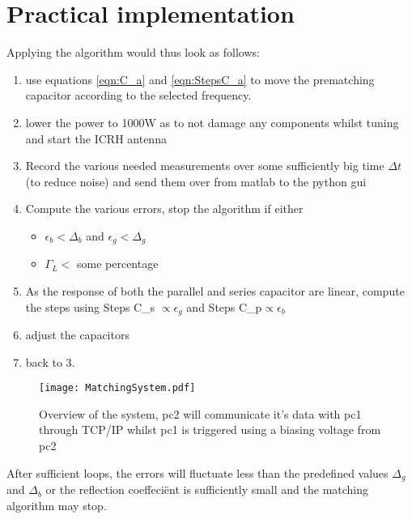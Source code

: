 \section{Practical implementation}
Applying the algorithm would thus look as follows:
\begin{enumerate}
	\item use equations \ref{eqn:C_a} and \ref{eqn:StepsC_a} to move the prematching capacitor according to the selected frequency.
	\item lower the power to 1000W as to not damage any components whilst tuning and start the ICRH antenna
	\item Record the various needed measurements over some sufficiently big time $\Delta t$ (to reduce noise) and send them over from matlab to the python gui 
	\item Compute the various errors, stop the algorithm if either 
		\begin{itemize}
			\item $\epsilon_b < \Delta_b$ and $\epsilon_g < \Delta_g$ 
			\item $\Gamma_L <$ some percentage
		\end{itemize}
	\item As the response of both the parallel and series capacitor are linear, compute the steps using Steps C_s $\propto\epsilon_g$ and Steps C_p$\propto\epsilon_b$
	\item adjust the capacitors
	\item back to 3.
\end{enumerate}
\begin{figure}[h]
	\centering
	\texttt{[image: MatchingSystem.pdf]}
	\caption{Overview of the system, pc2 will communicate it's data with pc1 through TCP/IP whilst pc1 is triggered using a biasing voltage from pc2}
	\label{fig:system}
\end{figure}
After sufficient loops, the errors will fluctuate less than the predefined values $\Delta_g$ and $\Delta_b$ or the reflection coeffeciënt is sufficiently small and the matching algorithm may stop.

